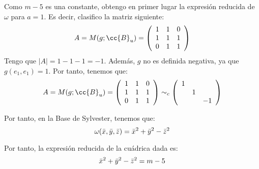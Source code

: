 \documentclass[12pt]{article}
\begin{document}
\begin{ejercicio}
\begin{enumerate}
        Como $m-5$ es una constante, obtengo en primer lugar la expresión reducida de $\omega$ para $a=1$. Es decir, clasifico la matriz siguiente:
        \begin{equation*}
            A = M(g;\cc{B}_u) = \left(\begin{array}{ccc}
                1 & 1 & 0\\
                1 & 1 & 1\\
                0 & 1 & 1
            \end{array}\right)
        \end{equation*}
        Tengo que $|A|=1-1-1=-1$. Además, $g$ no es definida negativa, ya que $g(e_1, e_1)=1$. Por tanto, tenemos que:
        \begin{equation*}
            A = M(g;\cc{B}_u) = \left(\begin{array}{ccc}
                1 & 1 & 0\\
                1 & 1 & 1\\
                0 & 1 & 1
            \end{array}\right) \sim_c
            \left(\begin{array}{ccc}
                1 & \\
                 & 1 \\
                && -1
            \end{array}\right)
        \end{equation*}

        Por tanto, en la Base de Sylvester, tenemos que:
        \begin{equation*}
            \omega(\bar{x}, \bar{y}, \bar{z}) = \bar{x}^2 + \bar{y}^2 - \Bar{z}^2
        \end{equation*}

        Por tanto, la expresión reducida de la cuádrica dada es:
        \begin{equation*}
            \bar{x}^2 + \bar{y}^2 - \Bar{z}^2 = m-5
        \end{equation*}
    \end{enumerate}
\end{ejercicio}
\end{document}
